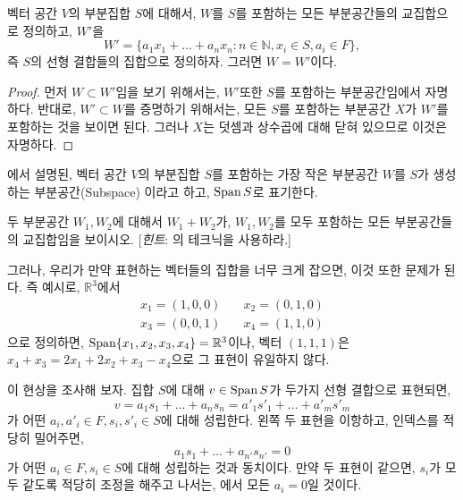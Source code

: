 \begin{theorem}
\label{thm:smallspan}
    벡터 공간 $V$의 부분집합 $S$에 대해서, $W$를 $S$를 포함하는 모든 부분공간들의 교집합으로 정의하고, $W'$을
    \begin{equation*}
        W' = \{a_1 x_1 + \dots + a_n x_n : n \in \mathbb{N}, x_i \in S, a_i \in F\},
    \end{equation*}
    즉 $S$의 선형 결합들의 집합으로 정의하자.
    그러면 $W = W'$이다.
\end{theorem}
\begin{proof}
    먼저 $W \subset W'$임을 보기 위해서는, $W'$또한 $S$를 포함하는 부분공간임에서 자명하다.
    반대로, $W' \subset W$를 증명하기 위해서는, 모든 $S$를 포함하는 부분공간 $X$가 $W'$를 포함하는 것을 보이면 된다.
    그러나 $X$는 덧셈과 상수곱에 대해 닫혀 있으므로 이것은 자명하다.
\end{proof}

\begin{definition}
    에서 설명된, 벡터 공간 $V$의 부분집합 $S$를 포함하는 가장 작은 부분공간 $W$를 $S$가 생성하는 부분공간(Subspace) 이라고 하고, $\operatorname{Span} S$로 표기한다.  
\end{definition}

\begin{exercise}
    두 부분공간 $W_1, W_2$에 대해서 $W_1 + W_2$가, $W_1, W_2$를 모두 포함하는 모든 부분공간들의 교집합임을 보이시오. [\textit{힌트}: 의 테크닉을 사용하라.]
\end{exercise}

그러나, 우리가 만약 표현하는 벡터들의 집합을 너무 크게 잡으면, 이것 또한 문제가 된다.
즉 예시로, $\mathbb{R}^3$에서
\begin{align*}
    x_1 = (1, 0, 0) &\quad x_2 = (0, 1, 0) \\
    x_3 = (0, 0, 1) &\quad x_4 = (1, 1, 0)
\end{align*}
으로 정의하면, $\operatorname{Span} \{x_1, x_2, x_3, x_4\} = \mathbb{R}^3$이나, 벡터 $(1, 1, 1)$은 $x_4 + x_3 = 2x_1 + 2x_2 + x_3 - x_4$으로 그 표현이 유일하지 않다.

이 현상을 조사해 보자.
집합 $S$에 대해 $v \in \operatorname{Span} S$가 두가지 선형 결합으로 표현되면,
\begin{equation*}
    v = a_1 s_1 + \dots + a_n s_n = a'_1 s'_1 + \dots + a'_m s'_m
\end{equation*}
가 어떤 $a_i, a'_i \in F, s_i, s'_i \in S$에 대해 성립한다.
왼쪽 두 표현을 이항하고, 인덱스를 적당히 밀어주면,
\begin{equation}
\label{eq:linind1}
    a_1 s_1 + \dots + a_{n'} s_{n'} = 0 
\end{equation}
가 어떤 $a_i \in F, s_i \in S$에 대해 성립하는 것과 동치이다.
만약 두 표현이 같으면, $s_i$가 모두 같도록 적당히 조정을 해주고 나서는, 에서 모든 $a_i = 0$일 것이다.

